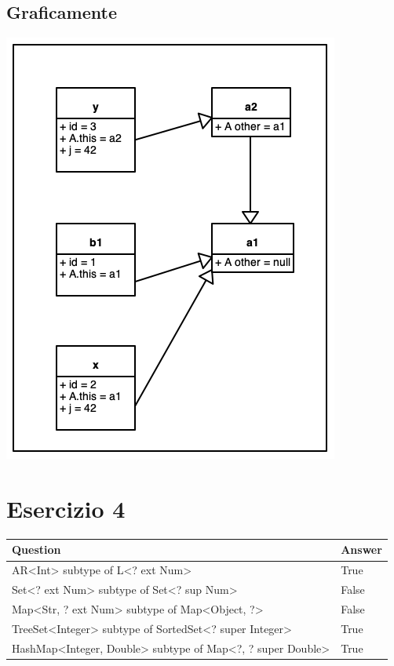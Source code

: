 \documentclass[11pt]{article}
\begin{document}
\subsection{Graficamente}
\label{sec:org3863a57}
\begin{center}
\includegraphics[width=.9\linewidth]{./src/mem_layout.png}
\end{center}
\section{Esercizio 4}
\label{sec:org93650b8}
\begin{center}
\begin{tabular}{ll}
Question & Answer\\[0pt]
\hline
AR<Int> subtype of L<? ext Num> & True\\[0pt]
Set<? ext Num> subtype of Set<? sup Num> & False\\[0pt]
Map<Str, ? ext Num> subtype of Map<Object, ?> & False\\[0pt]
TreeSet<Integer> subtype of SortedSet<? super Integer> & True\\[0pt]
HashMap<Integer, Double> subtype of Map<?, ? super Double> & True\\[0pt]
\end{tabular}
\end{center}
\end{document}
